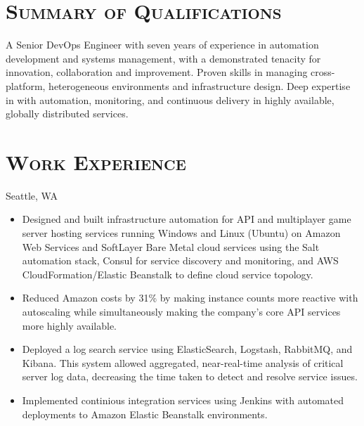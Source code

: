 \documentclass[11pt,letter,roman]{moderncv}
\begin{document}
\makecvtitle{}
\vspace{-\baselineskip}

\section{\textsc{Summary of Qualifications}}
A Senior DevOps Engineer with seven years of experience in automation
development and systems management, with a demonstrated tenacity for
innovation, collaboration and improvement. Proven skills in managing
cross-platform, heterogeneous environments and infrastructure design. Deep
expertise in with automation, monitoring, and continuous delivery in highly
available, globally distributed services.

\section{\textsc{Work Experience}}
{Seattle, WA}{}{%
  \begin{itemize}
    \item Designed and built infrastructure automation for API and multiplayer
      game server hosting services running Windows and Linux (Ubuntu) on Amazon
      Web Services and SoftLayer Bare Metal cloud services using the Salt
      automation stack, Consul for service discovery and monitoring, and AWS
      CloudFormation/Elastic Beanstalk to define cloud service topology.
    \item Reduced Amazon costs by 31\% by making instance counts more reactive
      with autoscaling while simultaneously  making the company's core API
      services more highly available.
    \item Deployed a log search service using ElasticSearch, Logstash,
      RabbitMQ, and Kibana. This system allowed aggregated, near-real-time
      analysis of critical server log data, decreasing the time taken to detect
      and resolve service issues.
    \item Implemented continious integration services using Jenkins with
      automated deployments to Amazon Elastic Beanstalk environments.
  \end{itemize}
}
\end{document}
